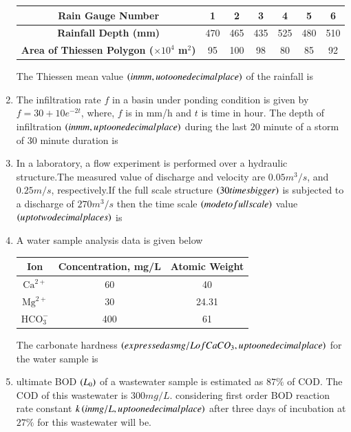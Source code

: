 \documentclass[journal,12pt,twocolumn]{IEEEtran}
\theoremstyle{remark}
\begin{document}
\begin{enumerate}
\begin{table}[h!]
\centering
\begin{tabular}{|c|c|c|c|c|c|c|}
\hline
\textbf{Rain Gauge Number} & 1 & 2 & 3 & 4 & 5 & 6 \\
\hline
\textbf{Rainfall Depth (mm)} & 470 & 465 & 435 & 525 & 480 & 510 \\
\hline
\textbf{Area of Thiessen Polygon ($\times 10^4$ m$^2$)} & 95 & 100 & 98 & 80 & 85 & 92 \\
\hline
\end{tabular}
\end{table}
The Thiessen mean value $\left(in mm, uo to one decimal place\right)$ of the rainfall is\\
\item The infiltration rate $f$ in a basin under ponding condition is given by $f=30+10e^{-2t}$,
where, $f$ is in mm/h and $t$ is time in hour. The depth of infiltration $\left(in mm, up to one decimal place\right)$ during the last $20$ minute of a storm of $30$ minute duration is\\
\item In a laboratory, a flow experiment is performed over a hydraulic structure.The measured value of discharge and velocity are  $0.05 m^{3}/s$, and $0.25 m/s$, respectively.If the full scale structure $\left(30 times bigger\right)$ is subjected to a discharge of $270 m^{3}/s$ then the time scale $\left(mode to full scale\right)$ value $\left(up to two decimal places\right)$ is\\
\item A water sample analysis data is given below\\
\begin{table}[h!]
    \centering
    \begin{tabular}{|c|c|c|}
        \hline
        \textbf{Ion} & \textbf{Concentration, mg/L} & \textbf{Atomic Weight} \\
        \hline
        $\text{Ca}^{2+}$ & 60 & 40 \\
        \hline
        $\text{Mg}^{2+}$ & 30 & 24.31 \\
        \hline
        $\text{HCO}_{3}^{-}$ & 400 & 61 \\
        \hline
    \end{tabular}
\end{table}
The carbonate hardness $\left(expressed as mg/L of CaCO_{3}, up to one decimal place\right)$ for the water sample is\\
\item ultimate BOD $\left(L_{0}\right)$ of a wastewater sample is estimated as $87\%$ of COD. The COD of this wastewater is $300 mg/L$. considering first order BOD reaction rate constant $k \left(in mg/L, up to one decimal place\right)$ after three days of incubation at $27\%$ for this wastewater will be.









 
 \end{enumerate}
\end{document}
